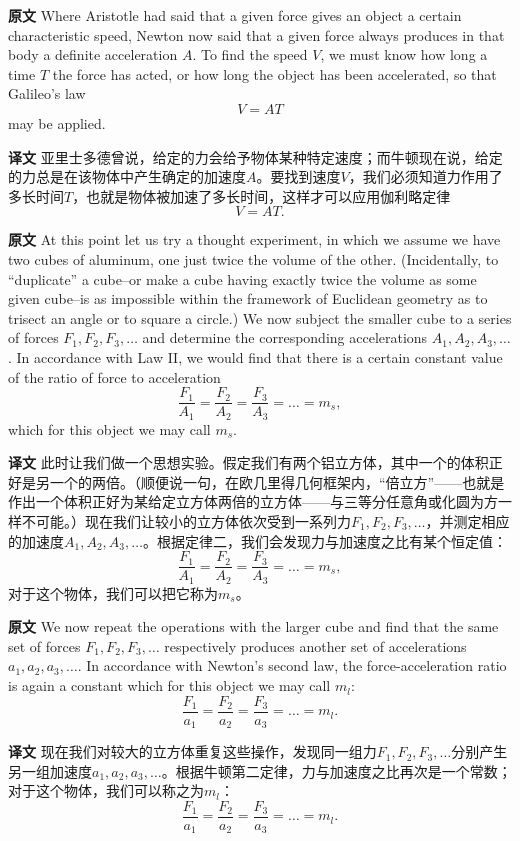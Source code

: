 \documentclass[UTF8,zihao=-4]{ctexart}
\begin{document}
\noindent\textbf{原文} Where Aristotle had said that a given force gives an object a certain characteristic speed, Newton now said that a given force always produces in that body a definite acceleration $A$. To find the speed $V$, we must know how long a time $T$ the force has acted, or how long the object has been accelerated, so that Galileo's law
\[
V = AT
\]
may be applied.
\par\noindent\textbf{译文} 亚里士多德曾说，给定的力会给予物体某种特定速度；而牛顿现在说，给定的力总是在该物体中产生确定的加速度$A$。要找到速度$V$，我们必须知道力作用了多长时间$T$，也就是物体被加速了多长时间，这样才可以应用伽利略定律
\[
V = AT.
\]
\medskip

\noindent\textbf{原文} At this point let us try a thought experiment, in which we assume we have two cubes of aluminum, one just twice the volume of the other. (Incidentally, to ``duplicate'' a cube--or make a cube having exactly twice the volume as some given cube--is as impossible within the framework of Euclidean geometry as to trisect an angle or to square a circle.) We now subject the smaller cube to a series of forces $F_{1}, F_{2}, F_{3}, \ldots$ and determine the corresponding accelerations $A_{1}, A_{2}, A_{3}, \ldots$. In accordance with Law II, we would find that there is a certain constant value of the ratio of force to acceleration
\[
\frac{F_{1}}{A_{1}} = \frac{F_{2}}{A_{2}} = \frac{F_{3}}{A_{3}} = \dots = m_{s},
\]
which for this object we may call $m_s$.
\par\noindent\textbf{译文} 此时让我们做一个思想实验。假定我们有两个铝立方体，其中一个的体积正好是另一个的两倍。（顺便说一句，在欧几里得几何框架内，“倍立方”——也就是作出一个体积正好为某给定立方体两倍的立方体——与三等分任意角或化圆为方一样不可能。）现在我们让较小的立方体依次受到一系列力$F_{1}, F_{2}, F_{3}, \ldots$，并测定相应的加速度$A_{1}, A_{2}, A_{3}, \ldots$。根据定律二，我们会发现力与加速度之比有某个恒定值：
\[
\frac{F_{1}}{A_{1}} = \frac{F_{2}}{A_{2}} = \frac{F_{3}}{A_{3}} = \dots = m_{s},
\]
对于这个物体，我们可以把它称为$m_s$。
\medskip

\noindent\textbf{原文} We now repeat the operations with the larger cube and find that the same set of forces $F_1, F_2, F_3, \ldots$ respectively produces another set of accelerations $a_1, a_2, a_3, \ldots$. In accordance with Newton's second law, the force-acceleration ratio is again a constant which for this object we may call $m_l$:
\[
\frac{F_{1}}{a_{1}} = \frac{F_{2}}{a_{2}} = \frac{F_{3}}{a_{3}} = \dots = m_{l}.
\]
\par\noindent\textbf{译文} 现在我们对较大的立方体重复这些操作，发现同一组力$F_1, F_2, F_3, \ldots$分别产生另一组加速度$a_1, a_2, a_3, \ldots$。根据牛顿第二定律，力与加速度之比再次是一个常数；对于这个物体，我们可以称之为$m_l$：
\[
\frac{F_{1}}{a_{1}} = \frac{F_{2}}{a_{2}} = \frac{F_{3}}{a_{3}} = \dots = m_{l}.
\]
\medskip
\end{document}
